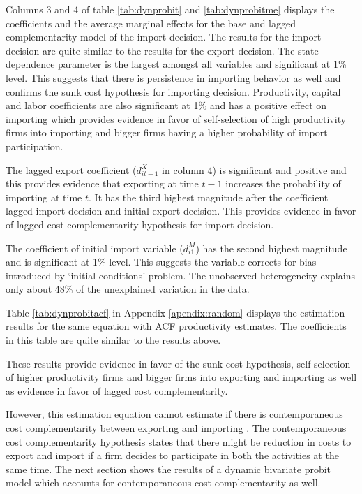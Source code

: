 \documentclass[12pt]{article}
\begin{document}
 Columns 3 and 4 of table \ref{tab:dynprobit} and
  \ref{tab:dynprobitme} displays the coefficients and the average
  marginal effects for the base and lagged complementarity model of the
  import decision. The results for the import decision are quite similar to the
 results for the export decision. The state dependence parameter is the largest
  amongst all variables and
  significant at 1\% level. This suggests that there is  persistence in
  importing behavior as well and confirms the sunk cost hypothesis for
  importing decision. 
Productivity, capital and labor coefficients are also significant at 1\%
  and has a 
  positive effect on importing which provides evidence in favor of
  self-selection of high productivity firms into importing and 
  bigger firms having a higher probability of import participation.  

The lagged export coefficient ($d_{it-1}^{X}$ in column 4) is
  significant and positive and this provides evidence that exporting
  at time $t-1$ increases the probability of importing at time $t$. It
  has the third highest magnitude after the coefficient lagged import
  decision and initial export decision.  This
 provides  evidence in favor of 
  lagged cost complementarity hypothesis for
  import decision.  

The coefficient of initial import variable ($d_{i1}^{M}$) has the
second highest magnitude  and is 
  significant at 1\% level. This suggests the variable corrects for
  bias introduced by `initial conditions' problem.    The
  unobserved heterogeneity  explains only about 48\% of the unexplained
  variation in the data.  

Table \ref{tab:dynprobitacf} in Appendix \ref{apendix:random} displays the estimation results for the same
equation with ACF productivity estimates. The coefficients in this
table are quite similar to the results above. 

These results provide evidence in favor of  the sunk-cost hypothesis,
self-selection of higher productivity firms and bigger firms into
exporting and importing as well as evidence in favor of lagged cost
complementarity. 

However, this estimation equation cannot estimate if
there is contemporaneous cost complementarity between exporting
and importing . The contemporaneous cost complementarity hypothesis
states that there might be reduction in costs to export and import if
a firm decides to participate in both the activities at the same time.
The next section shows the results of a dynamic
bivariate probit model which accounts for contemporaneous cost complementarity
as well. 
\end{document}

